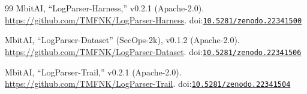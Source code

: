 \documentclass[11pt]{article}
\newcommand{\doiref}[1]{\href{https://doi.org/#1}{\texttt{#1}}}
\begin{document}
\begin{thebibliography}{99}
 MbitAI, ``LogParser-Harness,'' v0.2.1
(Apache-2.0).
\url{https://github.com/TMFNK/LogParser-Harness}.
doi:\doiref{10.5281/zenodo.22341500}

 MbitAI, ``LogParser-Dataset'' (SecOps-2k),
v0.1.2 (Apache-2.0).
\url{https://github.com/TMFNK/LogParser-Dataset}.
doi:\doiref{10.5281/zenodo.22341506}

 MbitAI, ``LogParser-Trail,'' v0.2.1
(Apache-2.0).
\url{https://github.com/TMFNK/LogParser-Trail}.
doi:\doiref{10.5281/zenodo.22341504}
\end{thebibliography}
\end{document}
